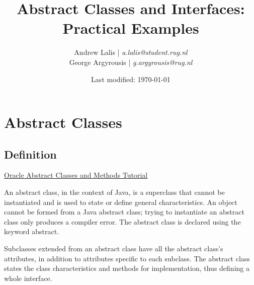 \documentclass{article}
\begin{document}
    \title{Abstract Classes and Interfaces: Practical Examples}
    \author{Andrew Lalis | \emph{a.lalis@student.rug.nl} \\
            George Argyrousis | \emph{g.argyrousis@rug.nl} }
    \date{Last modified: \today}

    \maketitle

    \section{Abstract Classes}
        \subsection{Definition}
        	\href{https://docs.oracle.com/javase/tutorial/java/IandI/abstract.html}{Oracle Abstract Classes and Methods Tutorial}

            An abstract class, in the context of Java, is a superclass that cannot be instantiated and is used to state or define general characteristics. An object cannot be formed from a Java abstract class; trying to instantiate an abstract class only produces a compiler error. The abstract class is declared using the keyword abstract.

            Subclasses extended from an abstract class have all the abstract class's attributes, in addition to attributes specific to each subclass. The abstract class states the class characteristics and methods for implementation, thus defining a whole interface.
\end{document}
